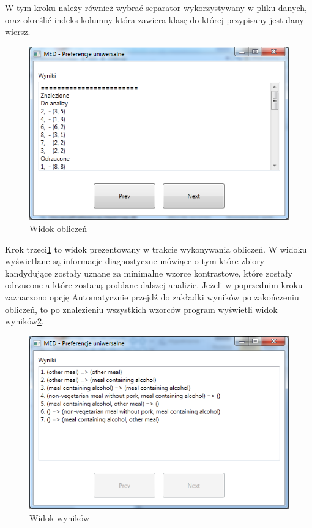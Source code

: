 \documentclass[a4paper,12pt]{article}
\begin{document}
W tym kroku należy również wybrać separator wykorzystywany w pliku danych, oraz określić indeks kolumny która zawiera klasę do której przypisany jest dany wiersz.\\

\begin{figure}[h!]
\begin{center}
\includegraphics[width=\textwidth]{img/3.png}
\caption{Widok obliczeń}
\label{krok3}
\end{center}
\end{figure}

Krok trzeci\ref{krok3} to widok prezentowany w trakcie wykonywania obliczeń. W widoku wyświetlane są informacje diagnostyczne mówiące o tym które zbiory kandydujące zostały uznane za minimalne wzorce kontrastowe, które zostały odrzucone a które zostaną poddane dalszej analizie. Jeżeli w poprzednim kroku zaznaczono opcję Automatycznie przejdź do zakładki wyników po zakończeniu obliczeń, to po znalezieniu wszystkich wzorców program wyświetli widok wyników\ref{krok4}.\\

\begin{figure}[h!]
\begin{center}
\includegraphics[width=\textwidth]{img/4.png}
\caption{Widok wyników}
\label{krok4}
\end{center}
\end{figure}



\end{document}

